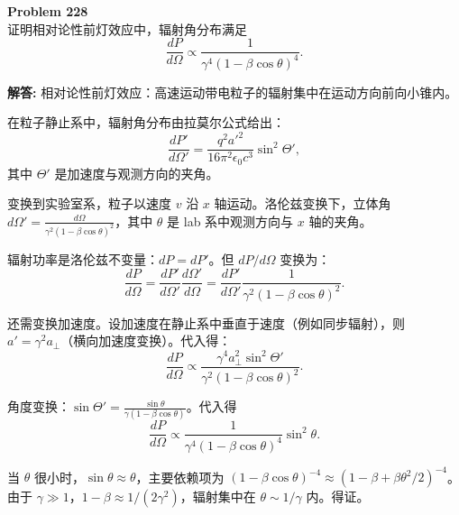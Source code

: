\documentclass[12pt, a4paper, oneside]{ctexart}
\newenvironment{solution}{\par\noindent\textbf{解答:}\quad}{\par}
\begin{document}
\begin{mdframed}[backgroundcolor=gray!10, linewidth=0pt]
    \textbf{Problem 228} \\
    证明相对论性前灯效应中，辐射角分布满足
    \[
    \frac{dP}{d\Omega} \propto \frac{1}{\gamma^4 (1 - \beta \cos\theta)^4}.
    \]
\end{mdframed}
\begin{solution}
    相对论性前灯效应：高速运动带电粒子的辐射集中在运动方向前向小锥内。
    
    在粒子静止系中，辐射角分布由拉莫尔公式给出：
    \[
    \frac{dP'}{d\Omega'} = \frac{q^2 a'^2}{16\pi^2 \epsilon_0 c^3} \sin^2 \Theta',
    \]
    其中 $\Theta'$ 是加速度与观测方向的夹角。
    
    变换到实验室系，粒子以速度 $v$ 沿 $x$ 轴运动。洛伦兹变换下，立体角 $d\Omega' = \frac{d\Omega}{\gamma^2 (1 - \beta \cos\theta)^2}$，其中 $\theta$ 是 lab 系中观测方向与 $x$ 轴的夹角。
    
    辐射功率是洛伦兹不变量：$dP = dP'$。但 $dP/d\Omega$ 变换为：
    \[
    \frac{dP}{d\Omega} = \frac{dP'}{d\Omega'} \frac{d\Omega'}{d\Omega} = \frac{dP'}{d\Omega'} \frac{1}{\gamma^2 (1 - \beta \cos\theta)^2}.
    \]
    
    还需变换加速度。设加速度在静止系中垂直于速度（例如同步辐射），则 $a' = \gamma^2 a_\perp$（横向加速度变换）。代入得：
    \[
    \frac{dP}{d\Omega} \propto \frac{\gamma^4 a_\perp^2 \sin^2 \Theta'}{\gamma^2 (1 - \beta \cos\theta)^2}.
    \]
    
    角度变换：$\sin\Theta' = \frac{\sin\theta}{\gamma (1 - \beta \cos\theta)}$。代入得
    \[
    \frac{dP}{d\Omega} \propto \frac{1}{\gamma^4 (1 - \beta \cos\theta)^4} \sin^2 \theta.
    \]
    
    当 $\theta$ 很小时，$\sin\theta \approx \theta$，主要依赖项为 $(1 - \beta \cos\theta)^{-4} \approx (1 - \beta + \beta \theta^2/2)^{-4}$。由于 $\gamma \gg 1$，$1-\beta \approx 1/(2\gamma^2)$，辐射集中在 $\theta \sim 1/\gamma$ 内。得证。
\end{solution}
\end{document}
